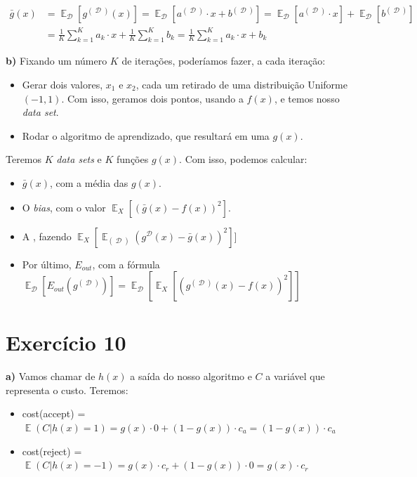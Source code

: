 \documentclass[12pt,letterpaper]{article}
\DeclareMathOperator{\expv}{\mathbb{E}}
\DeclareMathOperator{\data}{\mathcal{D}}
\begin{document}
	\begin{equation*}
		\begin{split}
			\bar{g}(x) & = \expv_{\data}[g^{(\data)}(x)] = \expv_{\data}[a^{(\data)}\cdot x + b^{(\data)}] = \expv_{\data}[a^{(\data)}\cdot x] + \expv_{\data}[b^{(\data)}] \\
			& = \frac{1}{K} \sum_{k=1}^{K} a_k \cdot x + \frac{1}{K} \sum_{k=1}^{K} b_k = \frac{1}{K} \sum_{k=1}^{K} a_k \cdot x + b_k
		\end{split}
	\end{equation*}
	
	\textbf{b)} Fixando um número $ K $ de iterações, poderíamos fazer, a cada iteração:
	
	\begin{itemize}
		\item Gerar dois valores, $ x_1 $ e $ x_2 $, cada um retirado de uma distribuição Uniforme$ (-1, 1) $. Com isso, geramos dois pontos, usando a $ f(x) $, e temos nosso \textit{data set}.
		\item Rodar o algoritmo de aprendizado, que resultará em uma $ g(x) $.
	\end{itemize}
	
	Teremos $ K $ \textit{data sets} e $ K $ funções $ g(x) $. Com isso, podemos calcular:
	
	\begin{itemize}
		\item $ \bar{g}(x) $, com a média das $ g(x) $.
		\item O \textit{bias}, com o valor $ \expv_X[(\bar{g}(x) - f(x))^2] $.
		\item A , fazendo $ \expv_X[\expv_{(\data)}(g^{\data}(x) - \bar{g}(x))^2]] $
		\item Por último, $ E_{out} $, com a fórmula $\expv_{\data}[E_{out} (g^{(\data)})] = \expv_{\data}[ \expv_X[ (g^{(\data)}(x) - f(x))^2]]$
	\end{itemize}
	
	\section*{Exercício 10}
	
	\textbf{a)} Vamos chamar de $ h(x) $ a saída do nosso algoritmo e $ C $ a variável que representa o custo. Teremos:
	
	\begin{itemize}
		\item cost(accept) = $\expv(C | h(x) = 1) = g(x) \cdot 0 + (1-g(x)) \cdot c_a = (1-g(x)) \cdot c_a$
		\item cost(reject) = $\expv(C | h(x) = -1) = g(x) \cdot c_r + (1-g(x)) \cdot 0 = g(x) \cdot c_r$
	\end{itemize}
	
\end{document}
